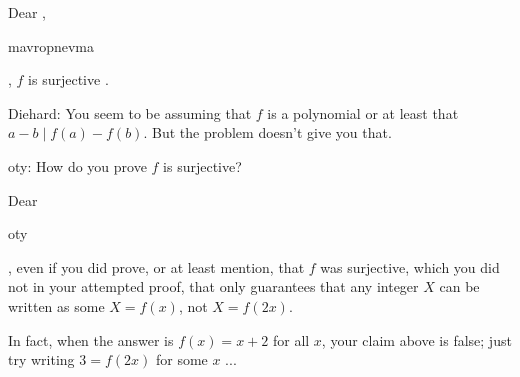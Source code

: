 \begin{solution}
	Dear , \begin{bolded}mavropnevma\end{bolded} , $f$ is surjective .
\end{solution}



\begin{solution}
	Diehard: You seem to be assuming that $f$ is a polynomial or at least that $a - b \mid f(a) - f(b)$. But the problem doesn't give you that.

oty: How do you prove $f$ is surjective?
\end{solution}



\begin{solution}
	Dear \begin{bolded}oty\end{bolded}, even if you did prove, or at least mention, that $f$ was surjective, which you did not in your attempted proof, that only guarantees that any integer $X$ can be written as some $X = f(x)$, not  $X = f(2x)$.

In fact, when the answer is $f(x) = x+2$ for all $x$, your claim above is false; just try writing $3=f(2x)$ for some $x$ ...
\end{solution}




